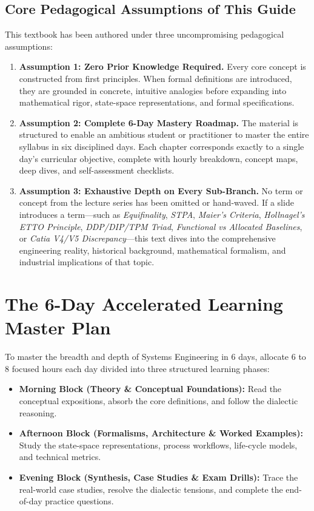 \section*{Core Pedagogical Assumptions of This Guide}
This textbook has been authored under three uncompromising pedagogical assumptions:
\begin{enumerate}[leftmargin=2em]
    \item \textbf{Assumption 1: Zero Prior Knowledge Required.} Every core concept is constructed from first principles. When formal definitions are introduced, they are grounded in concrete, intuitive analogies before expanding into mathematical rigor, state-space representations, and formal specifications.
    \item \textbf{Assumption 2: Complete 6-Day Mastery Roadmap.} The material is structured to enable an ambitious student or practitioner to master the entire syllabus in six disciplined days. Each chapter corresponds exactly to a single day's curricular objective, complete with hourly breakdown, concept maps, deep dives, and self-assessment checklists.
    \item \textbf{Assumption 3: Exhaustive Depth on Every Sub-Branch.} No term or concept from the lecture series has been omitted or hand-waved. If a slide introduces a term---such as \textit{Equifinality}, \textit{STPA}, \textit{Maier's Criteria}, \textit{Hollnagel's ETTO Principle}, \textit{DDP/DIP/TPM Triad}, \textit{Functional vs Allocated Baselines}, or \textit{Catia V4/V5 Discrepancy}---this text dives into the comprehensive engineering reality, historical background, mathematical formalism, and industrial implications of that topic.
\end{enumerate}

\clearpage

\chapter*{The 6-Day Accelerated Learning Master Plan}

To master the breadth and depth of Systems Engineering in 6 days, allocate 6 to 8 focused hours each day divided into three structured learning phases:
\begin{itemize}[leftmargin=1.5em]
    \item \textbf{Morning Block (Theory \& Conceptual Foundations):} Read the conceptual expositions, absorb the core definitions, and follow the dialectic reasoning.
    \item \textbf{Afternoon Block (Formalisms, Architecture \& Worked Examples):} Study the state-space representations, process workflows, life-cycle models, and technical metrics.
    \item \textbf{Evening Block (Synthesis, Case Studies \& Exam Drills):} Trace the real-world case studies, resolve the dialectic tensions, and complete the end-of-day practice questions.
\end{itemize}

